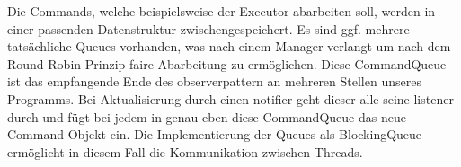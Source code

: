       \medskip
      Die Commands, welche beispielsweise der Executor abarbeiten soll, werden in
      einer passenden Datenstruktur zwischengespeichert. Es sind ggf. mehrere
      tatsächliche Queues vorhanden, was nach einem Manager verlangt um nach dem
      Round-Robin-Prinzip faire Abarbeitung zu ermöglichen. Diese CommandQueue
      ist das empfangende Ende des \gls{observerpattern} an mehreren Stellen unseres
      Programms. Bei Aktualisierung durch einen \gls{notifier} geht dieser alle
      seine \gls{listener} durch und fügt bei jedem in genau eben diese
      CommandQueue das neue Command-Objekt ein. Die Implementierung der Queues
      als BlockingQueue ermöglicht in diesem Fall die Kommunikation zwischen Threads.
